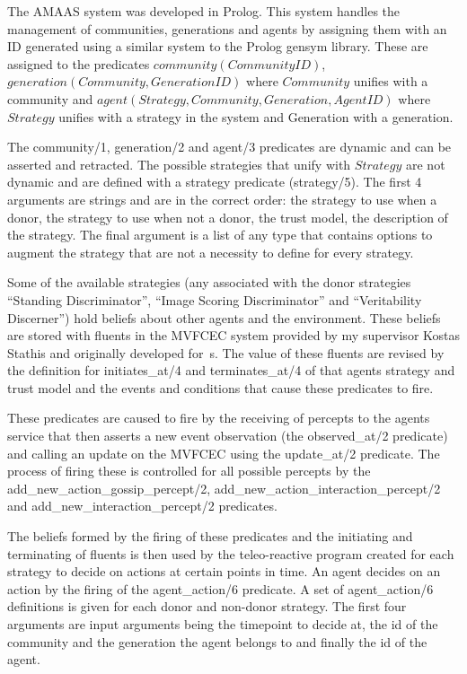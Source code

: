 \documentclass[]{final_report}
\begin{document}
The AMAAS system was developed in Prolog. This system handles the management of communities, generations and agents by assigning them with an ID generated using a similar system to the Prolog gensym library. These are assigned to the predicates $community(CommunityID)$, $generation(Community, GenerationID)$ where $Community$ unifies with a community and $agent(Strategy, Community, Generation, AgentID)$ where $Strategy$ unifies with a strategy in the system and Generation with a generation.\par
The community/1, generation/2 and agent/3 predicates are dynamic and can be asserted and retracted. The possible strategies that unify with $Strategy$ are not dynamic and are defined with a strategy predicate (strategy/5). The first 4 arguments are strings and are in the correct order: the strategy to use when a donor, the strategy to use when not a donor, the trust model, the description of the strategy. The final argument is a list of any type that contains options to augment the strategy that are not a necessity to define for every strategy.\par 
Some of the available strategies (any associated with the donor strategies ``Standing Discriminator'', ``Image Scoring Discriminator'' and ``Veritability Discerner'') hold beliefs about other agents and the environment. These beliefs are stored with fluents in the MVFCEC system provided by my supervisor Kostas Stathis and originally developed for~\cite{mvfcec}s. The value of these fluents are revised by the definition for initiates\_at/4 and terminates\_at/4 of that agents strategy and trust model and the events and conditions that cause these predicates to fire.\par
These predicates are caused to fire by the receiving of percepts to the agents service that then asserts a new event observation (the observed\_at/2 predicate) and calling an update on the MVFCEC using the update\_at/2 predicate. The process of firing these is controlled for all possible percepts by the add\_new\_action\_gossip\_percept/2, add\_new\_action\_interaction\_percept/2 and add\_new\_interaction\_percept/2 predicates.\par
The beliefs formed by the firing of these predicates and the initiating and terminating of fluents is then used by the teleo-reactive program created for each strategy to decide on actions at certain points in time. An agent decides on an action by the firing of the agent\_action/6 predicate. A set of agent\_action/6 definitions is given for each donor and non-donor strategy. The first four arguments are input arguments being the timepoint to decide at, the id of the community and the generation the agent belongs to and finally the id of the agent.\par 
\end{document}
